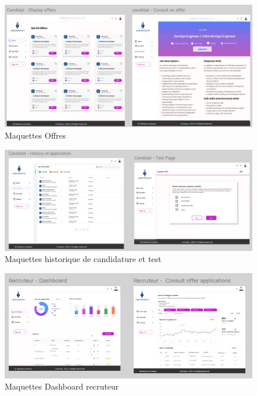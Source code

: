 \begin{figure}[htbp]
   \centering
   \includegraphics[scale=0.8]{Images/2.jpg} 
   \caption{Maquettes Offres}
   \label{fig:maquette2}
\end{figure}

\begin{figure}[htbp]
   \centering
   \includegraphics[scale=1]{Images/3.jpg} 
   \caption{Maquettes historique de candidature et test}
   \label{fig:maquette3}
\end{figure}

\begin{figure}[htbp]
   \centering
   \includegraphics[scale=1.4]{Images/4.jpg} 
   \caption{Maquettes Dashboard recruteur}
   \label{fig:maquette4}
\end{figure}

